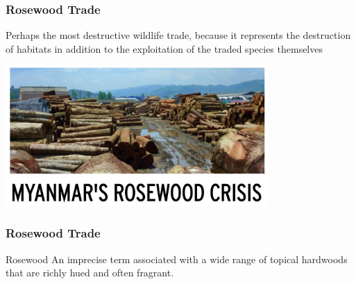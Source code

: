 \documentclass[10pt]{beamer}
\begin{document}
\begin{frame}[t]
\frametitle{Rosewood Trade}	
\vspace{0.5cm}

	Perhaps the most destructive wildlife trade, because it represents the destruction of habitats in addition to the exploitation of the traded species themselves
	
	\vspace{0.5cm}
	
	\begin{center}
		\includegraphics[width=0.75\textwidth]{figures/forest.png}
	\end{center}
\end{frame}


\begin{frame}[t]
\frametitle{Rosewood Trade}	
\vspace{1.0cm}

	\begin{block}{Rosewood}
		An imprecise term associated with a wide range of topical hardwoods that are richly hued and often fragrant.
	\end{block}	
\end{frame}
\end{document}
